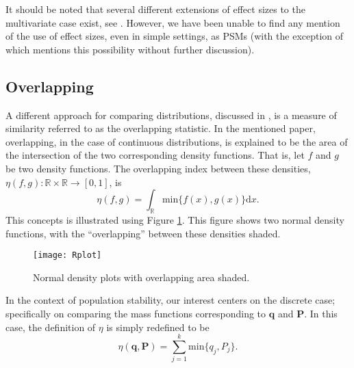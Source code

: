 \documentclass{article}
\theoremstyle{def}
\begin{document}
It should be noted that several different extensions of effect sizes to the multivariate case exist, see \cite{GK2005}. However, we have been unable to find any mention of the use of effect sizes, even in simple settings, as PSMs (with the exception of \cite{DUPISANIEVISAGIE2020} which mentions this possibility without further discussion).


\subsection{Overlapping}

A different approach for comparing distributions, discussed in \cite{PastoreCalcagni2019}, is a measure of similarity referred to as the overlapping statistic. In the mentioned paper, overlapping, in the case of continuous distributions, is explained to be the area of the intersection of the two corresponding density functions. That is, let $f$ and $g$ be two density functions. The overlapping index between these densities, $\eta(f,g): \mathbb{R} \times \mathbb{R} \rightarrow [0,1]$, is
\[
    \eta(f,g) = \int_{\mathbb{R}} \textrm{min}\{f(x),g(x)\} \textrm{d}x.
\]
This concepts is illustrated using Figure \ref{fig1}. This figure shows two normal density functions, with the ``overlapping'' between these densities shaded.

\begin{figure}[!htbp!] \label{fig1}
     \centering
     \texttt{[image: Rplot]}
     \caption{Normal density plots with overlapping area shaded.}
\end{figure}

In the context of population stability, our interest centers on the discrete case; specifically on comparing the mass functions corresponding to $\mathbf{q}$ and $\mathbf{P}$. In this case, the definition of $\eta$ is simply redefined to be
\[
    \eta(\mathbf{q},\mathbf{P}) = \sum_{j=1}^k \textrm{min}\{q_j,P_j\}.
\]
\end{document}
